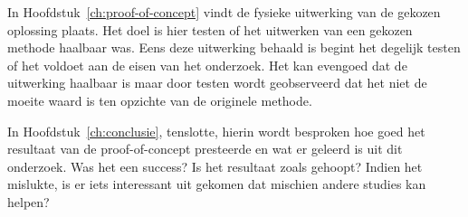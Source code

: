In Hoofdstuk~\ref{ch:proof-of-concept} vindt de fysieke uitwerking van de gekozen oplossing plaats. Het doel is hier testen of het uitwerken van een gekozen methode haalbaar was. Eens deze uitwerking behaald is begint het degelijk testen of het voldoet aan de eisen van het onderzoek. Het kan evengoed dat de uitwerking haalbaar is maar door testen wordt geobserveerd dat het niet de moeite waard is ten opzichte van de originele methode.


In Hoofdstuk~\ref{ch:conclusie}, tenslotte, hierin wordt besproken hoe goed het resultaat van de proof-of-concept presteerde en wat er geleerd is uit dit onderzoek. Was het een success? Is het resultaat zoals gehoopt? Indien het mislukte, is er iets interessant uit gekomen dat mischien andere studies kan helpen?





























 







